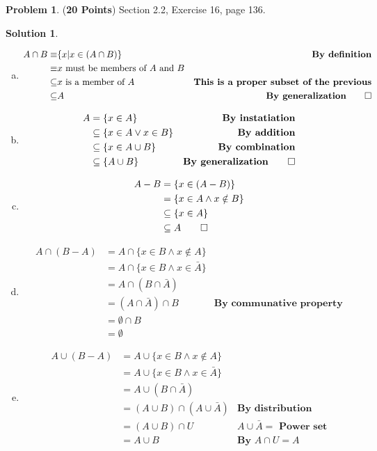 \documentclass{article}
\theoremstyle{definition}
\newtheorem{problem}{Problem}
\newtheorem*{solution}{Solution}
\begin{document}
\begin{problem} (\textbf{20 Points}) Section 2.2, Exercise 16, page 136.
\end{problem}
\begin{solution}\ \\
\begin{enumerate}[a)]
  \item
  \begin{align*}
    A \cap B \equiv& \{x | x \in (A \cap B) \} &\textbf{By definition} \\
    \equiv& x \text{ must be members of $A$ and $B$}\\
    \subseteq& x \text{ is a member of $A$} &\textbf{This is a proper subset of the previous}\\
    \subseteq& A &\textbf{By generalization} \qed
  \end{align*}
  \item
  \begin{align*}
    A &= \{x \in A \} & \textbf{By instatiation} \\
    &\subseteq \{x \in A \lor x \in B\} &\textbf{By addition} \\
    &\subseteq \{x \in A \cup B \} &\textbf{By combination} \\
    &\subseteq \{A \cup B \} &\textbf{By generalization} \qed
  \end{align*}
  \item
  \begin{align*}
    A - B &= \{x \in (A - B) \} \\
    &= \{x \in A \land x \notin B \} \\
    &\subseteq \{x \in A \} \\
    &\subseteq A \qed
    \end{align*}
    \item
    \begin{align*}
      A \cap (B - A) &= A \cap \{x \in B \land x \notin A \} \\
      &= A \cap \{x \in B \land x \in \bar A \} \\
      &= A \cap (B \cap \bar A) \\
      &= (A \cap \bar A) \cap B &\textbf{By communative property} \\
      &= \emptyset \cap B \\
      &= \emptyset
    \end{align*}
    \item
    \begin{align*}
      A \cup (B - A) &= A \cup \{x \in B \land x \notin A \} \\
      &= A \cup \{x \in B \land x \in \bar A \} \\
      &= A \cup (B \cap \bar A) \\
      &= (A \cup B) \cap (A \cup \bar A) &\textbf{By distribution} \\
      &= (A \cup B) \cap U &\textbf{$A \cup \bar A =$ Power set} \\
      &= A \cup B &\textbf{By $A \cap U = A$}
    \end{align*}
\end{enumerate}
\end{solution}
\end{document}
